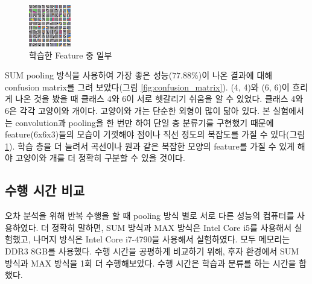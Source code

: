 \documentclass[a4paper,9pt]{article}
\begin{document}
\begin{multicols*}{2}
\begin{figure}[H]
\includegraphics[width=\linewidth]{feature}
\caption{학습한 Feature 중 일부}
\label{fig:feature}
\end{figure}

SUM pooling 방식을 사용하여 가장 좋은 성능($77.88$\%)이 나온 결과에 대해 confusion matrix를 그려 보았다(그림 \ref{fig:confusion_matrix}).
(4, 4)와 (6, 6)이 흐리게 나온 것을 봤을 때 클래스 4와 6이 서로 헷갈리기 쉬움을 알 수 있었다.
클래스 4와 6은 각각 고양이와 개이다.
고양이와 개는 단순한 외형이 많이 닮아 있다.
본 실험에서는 convolution과 pooling을 한 번만 하여 단일 층 분류기를 구현했기 때문에 feature(6x6x3)들의 모습이 기껏해야 점이나 직선 정도의 복잡도를 가질 수 있다(그림 \ref{fig:feature}).
학습 층을 더 늘려서 곡선이나 원과 같은 복잡한 모양의 feature를 가질 수 있게 해야 고양이와 개를 더 정확히 구분할 수 있을 것이다.

\subsection{수행 시간 비교}

오차 분석을 위해 반복 수행을 할 때 pooling 방식 별로 서로 다른 성능의 컴퓨터를 사용하였다.
더 정확히 말하면, SUM 방식과 MAX 방식은 Intel Core i5를 사용해서 실험했고, 나머지 방식은 Intel Core i7-4790을 사용해서 실험하였다.
모두 메모리는 DDR3 8GB를 사용했다.
수행 시간을 공평하게 비교하기 위해, 후자 환경에서 SUM 방식과 MAX 방식을 1회 더 수행해보았다.
수행 시간은 학습과 분류를 하는 시간을 합했다.


\end{multicols*}
\end{document}
